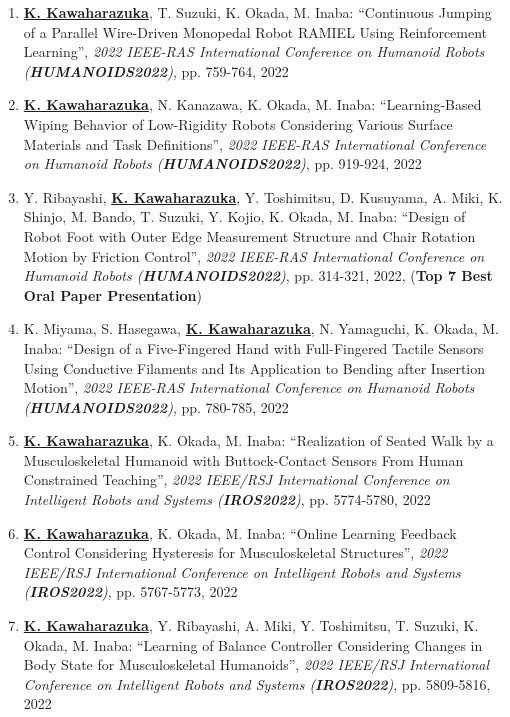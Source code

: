 \documentclass[letterpaper]{article}
\begin{document}
\begin{enumerate}
\item \underline{\textbf{K. Kawaharazuka}}, T. Suzuki, K. Okada, M. Inaba: ``Continuous Jumping of a Parallel Wire-Driven Monopedal Robot RAMIEL Using Reinforcement Learning'', \textit{2022 IEEE-RAS International Conference on Humanoid Robots (\textit{\textbf{HUMANOIDS2022}})}, pp. 759-764, 2022
\item \underline{\textbf{K. Kawaharazuka}}, N. Kanazawa, K. Okada, M. Inaba: ``Learning-Based Wiping Behavior of Low-Rigidity Robots Considering Various Surface Materials and Task Definitions'', \textit{2022 IEEE-RAS International Conference on Humanoid Robots (\textit{\textbf{HUMANOIDS2022}})}, pp. 919-924, 2022
\item Y. Ribayashi, \underline{\textbf{K. Kawaharazuka}}, Y. Toshimitsu, D. Kusuyama, A. Miki, K. Shinjo, M. Bando, T. Suzuki, Y. Kojio, K. Okada, M. Inaba: ``Design of Robot Foot with Outer Edge Measurement Structure and Chair Rotation Motion by Friction Control'', \textit{2022 IEEE-RAS International Conference on Humanoid Robots (\textit{\textbf{HUMANOIDS2022}})}, pp. 314-321, 2022, (\textbf{Top 7 Best Oral Paper Presentation})
\item K. Miyama, S. Hasegawa, \underline{\textbf{K. Kawaharazuka}}, N. Yamaguchi, K. Okada, M. Inaba: ``Design of a Five-Fingered Hand with Full-Fingered Tactile Sensors Using Conductive Filaments and Its Application to Bending after Insertion Motion'', \textit{2022 IEEE-RAS International Conference on Humanoid Robots (\textit{\textbf{HUMANOIDS2022}})}, pp. 780-785, 2022
\item \underline{\textbf{K. Kawaharazuka}}, K. Okada, M. Inaba: ``Realization of Seated Walk by a Musculoskeletal Humanoid with Buttock-Contact Sensors From Human Constrained Teaching'', \textit{2022 IEEE/RSJ International Conference on Intelligent Robots and Systems (\textit{\textbf{IROS2022}})}, pp. 5774-5780, 2022
\item \underline{\textbf{K. Kawaharazuka}}, K. Okada, M. Inaba: ``Online Learning Feedback Control Considering Hysteresis for Musculoskeletal Structures'', \textit{2022 IEEE/RSJ International Conference on Intelligent Robots and Systems (\textit{\textbf{IROS2022}})}, pp. 5767-5773, 2022
\item \underline{\textbf{K. Kawaharazuka}}, Y. Ribayashi, A. Miki, Y. Toshimitsu, T. Suzuki, K. Okada, M. Inaba: ``Learning of Balance Controller Considering Changes in Body State for Musculoskeletal Humanoids'', \textit{2022 IEEE/RSJ International Conference on Intelligent Robots and Systems (\textit{\textbf{IROS2022}})}, pp. 5809-5816, 2022

\end{enumerate}
\end{document}
